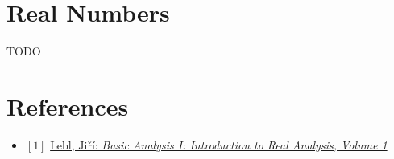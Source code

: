 \documentclass[12pt, letterpaper, oneside]{book}
\begin{document}
\chapter{Real Numbers}

TODO

\chapter*{References}

\begin{itemize}
  \item $[1]$ \href{https://ocw.mit.edu/courses/18-100a-real-analysis-fall-2020/resources/mit18_100af20_basic_analysis/}{Lebl, Jiří: \it{Basic Analysis I: Introduction to Real Analysis, Volume 1}}
\end{itemize}
\end{document}
